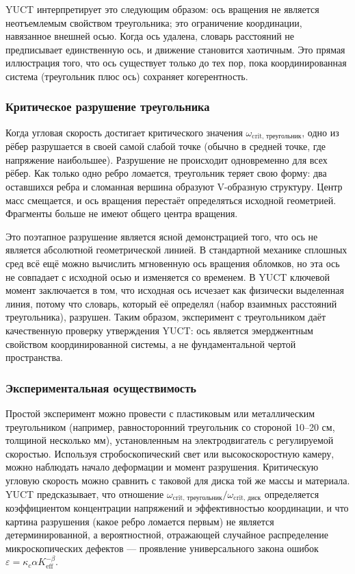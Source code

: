 \documentclass[12pt,a4paper]{article}
\begin{document}
	YUCT интерпретирует это следующим образом: ось вращения не является неотъемлемым свойством треугольника; это ограничение координации, навязанное внешней осью. Когда ось удалена, словарь расстояний не предписывает единственную ось, и движение становится хаотичным. Это прямая иллюстрация того, что ось существует только до тех пор, пока координированная система (треугольник плюс ось) сохраняет когерентность.
	
	\subsubsection{Критическое разрушение треугольника}
	
	Когда угловая скорость достигает критического значения \(\omega_{\text{crit, треугольник}}\), одно из рёбер разрушается в своей самой слабой точке (обычно в средней точке, где напряжение наибольшее). Разрушение не происходит одновременно для всех рёбер. Как только одно ребро ломается, треугольник теряет свою форму: два оставшихся ребра и сломанная вершина образуют V-образную структуру. Центр масс смещается, и ось вращения перестаёт определяться исходной геометрией. Фрагменты больше не имеют общего центра вращения.
	
	Это поэтапное разрушение является ясной демонстрацией того, что ось не является абсолютной геометрической линией. В стандартной механике сплошных сред всё ещё можно вычислить мгновенную ось вращения обломков, но эта ось не совпадает с исходной осью и изменяется со временем. В YUCT ключевой момент заключается в том, что исходная ось исчезает как физически выделенная линия, потому что словарь, который её определял (набор взаимных расстояний треугольника), разрушен. Таким образом, эксперимент с треугольником даёт качественную проверку утверждения YUCT: ось является эмерджентным свойством координированной системы, а не фундаментальной чертой пространства.
	
	\subsubsection{Экспериментальная осуществимость}
	
	Простой эксперимент можно провести с пластиковым или металлическим треугольником (например, равносторонний треугольник со стороной 10–20 см, толщиной несколько мм), установленным на электродвигатель с регулируемой скоростью. Используя стробоскопический свет или высокоскоростную камеру, можно наблюдать начало деформации и момент разрушения. Критическую угловую скорость можно сравнить с таковой для диска той же массы и материала. YUCT предсказывает, что отношение \(\omega_{\text{crit, треугольник}} / \omega_{\text{crit, диск}}\) определяется коэффициентом концентрации напряжений и эффективностью координации, и что картина разрушения (какое ребро ломается первым) не является детерминированной, а вероятностной, отражающей случайное распределение микроскопических дефектов — проявление универсального закона ошибок \(\varepsilon = \kappa_c \alpha K_{\mathrm{eff}}^{-\beta}\).
	
\end{document}

